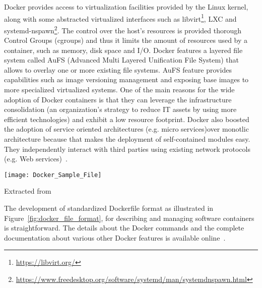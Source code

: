 Docker provides access to virtualization facilities provided by the 
Linux kernel, along with some abstracted virtualized interfaces such as 
libvirt\footnote{\url{https://libvirt.org/}}, LXC and 
systemd-nspawn\footnote{\url{https://www.freedesktop.org/software/systemd/man/systemdnspawn.html}}. 
The control over the host's resources is provided thorough Control 
Groups (cgroups) and thus it limits the amount of resources used by a 
container, such as memory, disk space and I/O. Docker features a layered 
file system called AuFS (Advanced Multi Layered Unification File 
System) that allows to overlay one or more existing file systems. AuFS 
feature provides capabilities such as image versioning management and 
exposing base images to more specialized virtualized systems. One of 
the main reasons for the wide adoption of Docker containers is that they 
can leverage the infrastructure consolidation (an organization's 
strategy to reduce IT assets by using more efficient technologies) and 
exhibit a low resource footprint. Docker also boosted the adoption 
of service oriented architectures (e.g. micro services)over monotlic architecture because that 
makes the deployment of self-contained modules easy. They independently interact with third parties using existing network 
protocols (e.g. Web services)~\cite{Xavier:2013:PEC:2497369.2497577}. 


\begin{center}
\texttt{[image: Docker\_Sample\_File]}
\label{fig:docker_file_format}
\caption*{Extracted from \cite{docker-file-format}}
\end{center}

The development of standardized Dockerfile format as illustrated in 
Figure~\ref{fig:docker_file_format}, for describing and managing 
software containers is straightforward. The details about the Docker commands and the complete 
documentation about various other Docker features is available online~\cite{docker_commands}.

